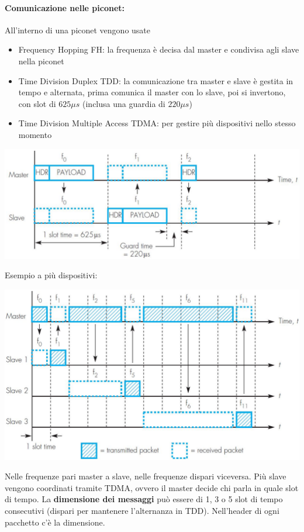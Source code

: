 \newpage

\paragraph{Comunicazione nelle piconet:} All'interno di una piconet vengono usate
\begin{itemize}
	\item Frequency Hopping FH: la frequenza è decisa dal master e condivisa agli slave nella piconet
	\item Time Division Duplex TDD: la comunicazione tra master e slave è gestita in tempo e alternata, prima comunica il master con lo slave, poi si invertono, con slot di $625\mu s$ (inclusa una guardia di $220 \mu s$)
	\item Time Division Multiple Access TDMA: per gestire più dispositivi nello stesso momento
\end{itemize}
\begin{center}
	\includegraphics[width=0.9\linewidth]{img/wpan/picocomm}
\end{center}


Esempio a più dispositivi: 
\begin{center}
	\includegraphics[width=0.9\linewidth]{img/wpan/picocomm2}
\end{center}

Nelle frequenze pari master a slave, nelle frequenze dispari viceversa. Più slave vengono coordinati tramite TDMA, ovvero il master decide chi parla in quale slot di tempo. La \textbf{dimensione dei messaggi} può essere di 1, 3 o 5 slot di tempo consecutivi (dispari per mantenere l'alternanza in TDD). Nell'header di ogni pacchetto c'è la dimensione.\\

